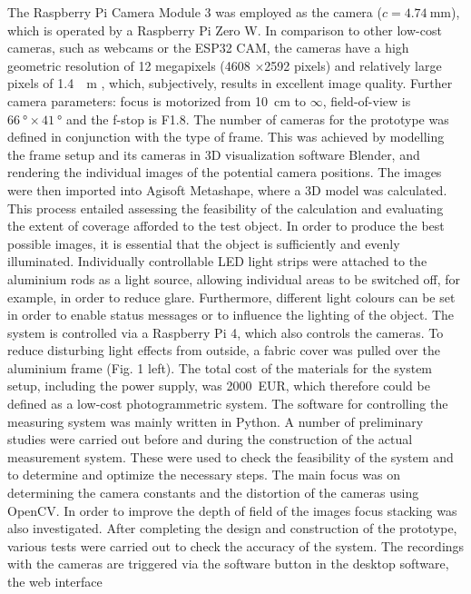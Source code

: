 \documentclass{isprs} %
\begin{document}
The Raspberry Pi Camera Module 3 was employed as the camera ($c = \SI{4.74}{\milli\metre}$), which is operated by a
Raspberry Pi Zero W. In comparison to other low-cost cameras, such as webcams or the ESP32 CAM, the
cameras have a high geometric resolution of 12 megapixels (4608 ×2592 pixels) and relatively large pixels of \SI{1.4}{\mu\metre} \cite{raspicamdatasheet}, which, subjectively, results in excellent image quality. Further camera
parameters: focus is motorized from \SI{10}{\centi\metre} to $\infty$, field-of-view is $\SI{66}{\degree} \times \SI{41}{\degree}$ and the f-stop is F1.8. The number of
cameras for the prototype was defined in conjunction with the type of frame. This was achieved by modelling the
frame setup and its cameras in 3D visualization software Blender, and rendering the individual images of the
potential camera positions. The images were then imported into Agisoft Metashape, where a 3D model was
calculated. This process entailed assessing the feasibility of the calculation and evaluating the extent of coverage
afforded to the test object.
In order to produce the best possible images, it is essential that the object is sufficiently and evenly illuminated.
Individually controllable LED light strips were attached to the aluminium rods as a light source, allowing
individual areas to be switched off, for example, in order to reduce glare. Furthermore, different light colours can
be set in order to enable status messages or to influence the lighting of the object. The system is controlled via a
Raspberry Pi 4, which also controls the cameras. To reduce disturbing light effects from outside, a fabric cover
was pulled over the aluminium frame (Fig. 1 left). The total cost of the materials for the system setup, including
the power supply, was \SI{2000}{EUR}, which therefore could be defined as a low-cost photogrammetric system.
The software for controlling the measuring system was mainly written in Python. A number of preliminary
studies were carried out before and during the construction of the actual measurement system. These were used
to check the feasibility of the system and to determine and optimize the necessary steps. The main focus was on
determining the camera constants and the distortion of the cameras using OpenCV. In order to improve the depth
of field of the images focus stacking was also investigated. After completing the design and construction of the
prototype, various tests were carried out to check the accuracy of the system.
The recordings with the cameras are triggered via the software button in the desktop software, the web interface
\end{document}
